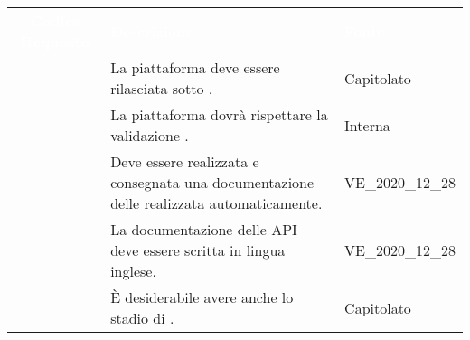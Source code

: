 \renewcommand{\arraystretch}{1.5}


\begin{longtable}{c C{9.5cm} C{2.5cm}} 
	
	\textcolor{white}{\textbf{Codice Requisito}}&
	\textcolor{white}{\textbf{Descrizione}}&
	\textcolor{white}{\textbf{Fonte}}\\

	 & La piattaforma deve essere rilasciata sotto . & Capitolato  \\

	 & La piattaforma dovrà rispettare la validazione . & Interna \\
	
	 & Deve essere realizzata e consegnata una documentazione delle  realizzata automaticamente. & VE\_2020\_12\_28 \\
	
	 & La documentazione delle API deve essere scritta in lingua inglese. & VE\_2020\_12\_28 \\
	
	 & È desiderabile avere anche lo stadio di . & Capitolato \\
	
\end{longtable}
